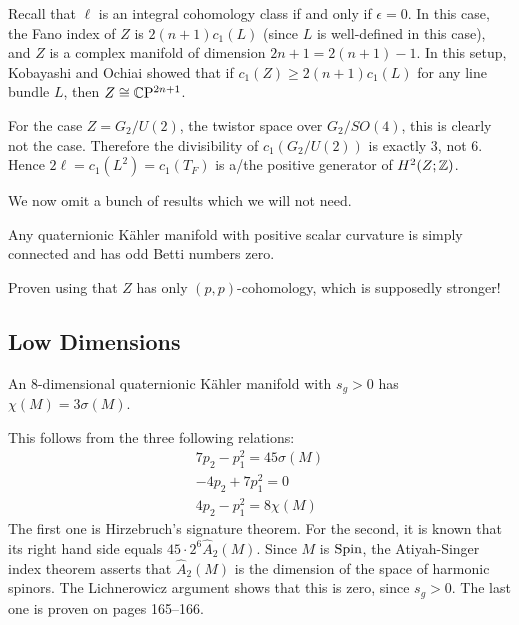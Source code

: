 \documentclass{scrartcl}
\begin{document}
\medskip

Recall that $\ell$ is an integral cohomology class if and only if $\epsilon=0$. In this case, the Fano index of $Z$ is $2(n+1)c_1(L)$ (since $L$ is well-defined in this case), and $Z$ is a complex manifold of dimension $2n+1=2(n+1)-1$. In this setup, Kobayashi and Ochiai showed that if $c_1(Z)\geq 2(n+1)c_1(L)$ for any line bundle $L$, then $Z\cong \mathbb{C}\mathrm{P}^{2n+1}$. 

\begin{rem}
	For the case $Z=G_2/U(2)$, the twistor space over $G_2/SO(4)$, this is clearly not the case. Therefore the divisibility of $c_1(G_2/U(2))$ is exactly $3$, not $6$. Hence $2\ell=c_1(L^2)=c_1(T_F)$ is a/the positive generator of $H^2(Z;\mathbb{Z})$. 
\end{rem}

We now omit a bunch of results which we will not need.

\begin{thm}
	Any quaternionic K\"ahler manifold with positive scalar curvature is simply connected and has odd Betti numbers zero.
\end{thm}

\begin{myproof}
	Proven using that $Z$ has only $(p,p)$-cohomology, which is supposedly stronger!
\end{myproof}

\subsection{Low Dimensions}

\begin{prop}
	An $8$-dimensional quaternionic K\"ahler manifold with $s_g>0$ has $\chi(M)=3\sigma(M)$.
\end{prop}
\begin{myproof}
	This follows from the three following relations:
	\begin{gather*}
		7p_2-p_1^2=45\sigma(M)\\
		-4p_2+7p_1^2=0\\
		4p_2-p_1^2=8\chi(M)
	\end{gather*}
	The first one is Hirzebruch's signature theorem. For the second, it is known that its right hand side equals $45\cdot 2^6\hat A_2(M)$. Since $M$ is $\operatorname{Spin}$, the Atiyah-Singer index theorem asserts that $\hat A_2(M)$ is the dimension of the space of harmonic spinors. The Lichnerowicz argument shows that this is zero, since $s_g>0$. The last one is proven on pages 165--166.
\end{myproof}
\end{document}
